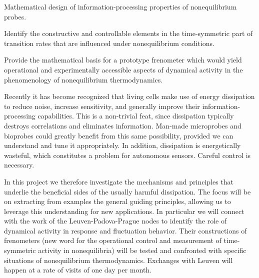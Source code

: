 \begin{workpackage}[id=WPdissipation,wphases=0-48,
short=Dissipation,
title=Harnessing dissipation,
lead=TUE,
TUERM=42,
KULRM=6]

\newrefsection

\begin{wpobjectives}
\begin{compactitem}
\item Mathematical design of information-processing properties of nonequilibrium probes.
\item Identify the constructive and controllable elements in the time-symmetric part of transition rates that are influenced under nonequilibrium conditions.
\item Provide the mathematical basis for a prototype frenometer which would yield operational and experimentally accessible aspects of dynamical activity in the phenomenology of nonequilibrium thermodynamics.
\end{compactitem}
\end{wpobjectives}

\begin{wpdescription}
Recently it has become recognized that living cells make use of energy dissipation to reduce noise, increase sensitivity, and generally improve their information-processing capabilities. This is a non-trivial feat, since dissipation typically destroys correlations and eliminates information. Man-made microprobes and bioprobes could greatly benefit from this same possibility, provided we can understand and tune it appropriately. In addition, dissipation is energetically wasteful, which constitutes a problem for autonomous sensors. Careful control is necessary. 

In this project we therefore investigate the mechanisms and principles that underlie the beneficial sides of the usually harmful dissipation. The focus will be on extracting from examples the general guiding principles, allowing us to leverage this understanding for new applications.  In particular we will connect with the work of the Leuven-Padova-Prague nodes to identify the role of dynamical activity in response and fluctuation behavior.
Their constructions of frenometers (new word for the operational control and measurement of time-symmetric activity in nonequilibria) will be tested and confronted with specific situations of nonequilibrium thermodynamics.
Exchanges with Leuven will happen at a rate of visits of one day per month.


\end{wpdescription}
\end{workpackage}
